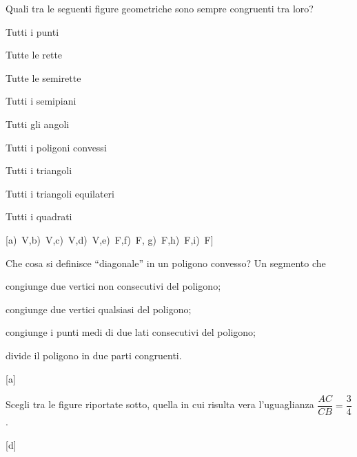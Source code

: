 \begin{esercizio}
\label{ese:1.128}
Quali tra le seguenti figure geometriche sono sempre congruenti tra 
loro?
\begin{multicols}{2}
\begin{enumeratea}
\item Tutti i punti                \hfill \boxV\quad\boxF
\item Tutte le rette               \hfill \boxV\quad\boxF
\item Tutte le semirette           \hfill \boxV\quad\boxF
\item Tutti i semipiani            \hfill \boxV\quad\boxF
\item Tutti gli angoli             \hfill \boxV\quad\boxF
\item Tutti i poligoni convessi    \hfill \boxV\quad\boxF
\item Tutti i triangoli            \hfill \boxV\quad\boxF
\item Tutti i triangoli equilateri \hfill \boxV\quad\boxF
\item Tutti i quadrati             \hfill \boxV\quad\boxF
\end{enumeratea}
\end{multicols}
\hfill[a)~V,\quad b)~V,\quad c)~V,\quad d)~V,\quad e)~F,\quad f)~F,\quad 
g)~F,\quad h)~F,\quad i)~F]
\end{esercizio}


\begin{esercizio}
\label{ese:1.129}
Che cosa si definisce ``diagonale'' in un poligono convesso? Un 
segmento che
\begin{enumeratea}
\item congiunge due vertici non consecutivi del poligono;
\item congiunge due vertici qualsiasi del poligono;
\item congiunge i punti medi di due lati consecutivi del poligono;
\item divide il poligono in due parti congruenti.
\end{enumeratea}
\vspace{-2em}
\hfill[a]
\end{esercizio}

	
\begin{esercizio}
\label{ese:1.130}
Scegli tra le figure riportate sotto, %
quella 
in cui risulta vera l'uguaglianza \(\dfrac{AC}{CB}=\dfrac{3}{4}\).
\begin{center}
\begin{inaccessibleblock}
 
\end{inaccessibleblock}
\end{center}
\vspace{-2.3em}
\hfill[d]
\end{esercizio}


